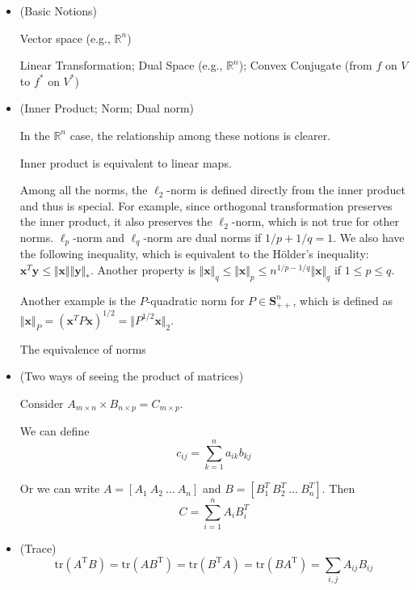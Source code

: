 \documentclass{article}
\begin{document}
\begin{itemize}

\item (Basic Notions)

Vector space (e.g., $\mathbb{R}^n$)

Linear Transformation; Dual Space (e.g., $\mathbb{R}^n$); Convex Conjugate (from $f$ on $V$ to $f^*$ on $V^*$)

\item (Inner Product; Norm; Dual norm) 

In the $\mathbb{R}^n$ case, the relationship among these notions is clearer. 

Inner product is equivalent to linear maps. 

Among all the norms, the $\ell_2$-norm is defined directly from the inner product and thus is special. For example, since orthogonal transformation preserves the inner product, it also preserves the $\ell_2$-norm, which is not true for other norms. $\ell_p$-norm and $\ell_q$-norm are dual norms if $1/p+1/q=1$. We also have the following inequality, which is equivalent to the H\"older's inequality: $\mathbf{x}^T\mathbf{y}\le\Vert \mathbf{x}\Vert\Vert \mathbf{y}\Vert_*$. Another property is $\Vert \mathbf{x}\Vert_q\le\Vert \mathbf{x}\Vert_p\le n^{1/p-1/q}\Vert \mathbf{x}\Vert_q$ if $1\le p\le q$.

Another example is the $P$-quadratic norm for $P\in\mathbf{S}^n_{++}$, which is defined as $\Vert \mathbf{x}\Vert_P=(\mathbf{x}^TP\mathbf{x})^{1/2}=\Vert P^{1/2}\mathbf{x}\Vert_2$.

The equivalence of norms

\item (Two ways of seeing the product of matrices)

Consider $A_{m\times n}\times B_{n\times p}=C_{m\times p}$.

We can define 
\begin{equation}\label{mprod1}
c_{ij}=\sum_{k=1}^na_{ik}b_{kj}
\end{equation}

Or we can write $A=[A_1\ A_2\ \ldots\ A_n]$ and $B=[B_1^T\ B_2^T\ \ldots\ B_n^T]$. Then
\begin{equation}\label{mprod2}
C=\sum_{i=1}^nA_iB_i^T
\end{equation}

\item (Trace)
\begin{equation}\label{mdotp}
\mathrm{tr}(A^\mathrm{T}B)=\mathrm{tr}(AB^\mathrm{T})=\mathrm{tr}(B^\mathrm{T}A)=\mathrm{tr}(BA^\mathrm{T})=\sum_{i,j}A_{ij}B_{ij}
\end{equation}


\end{itemize}
\end{document}
